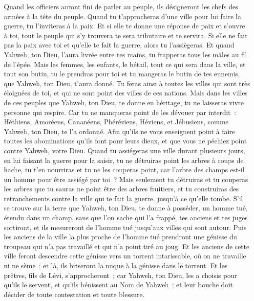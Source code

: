 \begin{multicols}{2}
Quand les officiers auront fini de parler au peuple, ils désigneront les chefs des armées à la tête du peuple.
Quand tu t'approcheras d'une ville pour lui faire la guerre, tu l'inviteras à la paix.
Et si elle te donne une réponse de paix et s'ouvre à toi, tout le peuple qui s'y trouvera te sera tributaire et te servira.
Si elle ne fait pas la paix avec toi et qu'elle te fait la guerre, alors tu l'assiègeras.
Et quand Yahweh, ton Dieu, l'aura livrée entre tes mains, tu frapperas tous les mâles au fil de l'épée.
Mais les femmes, les enfants, le bétail, tout ce qui sera dans la ville, et tout son butin, tu le prendras pour toi et tu mangeras le butin de tes ennemis, que Yahweh, ton Dieu, t'aura donné.
Tu feras ainsi à toutes les villes qui sont très éloignées de toi, et qui ne sont point des villes de ces nations.
Mais dans les villes de ces peuples que Yahweh, ton Dieu, te donne en héritage, tu ne laisseras vivre personne qui respire.
Car tu ne manqueras point de les dévouer par interdit~: Héthiens, Amoréens, Cananéens, Phéréziens, Héviens, et Jébusiens, comme Yahweh, ton Dieu, te l'a ordonné.
Afin qu'ils ne vous enseignent point à faire toutes les abominations qu'ils font pour leurs dieux, et que vous ne péchiez point contre Yahweh, votre Dieu.
Quand tu assiégeras une ville durant plusieurs jours, en lui faisant la guerre pour la saisir, tu ne détruiras point les arbres à coups de hache, tu t'en nourriras et tu ne les couperas point, car l'arbre des champs est-il un homme pour être assiégé par toi~?
Mais seulement tu détruiras et tu couperas les arbres que tu sauras ne point être des arbres fruitiers, et tu construiras des retranchements contre la ville qui te fait la guerre, jusqu'à ce qu'elle tombe.
\VerseOne{}S'il se trouve sur la terre que Yahweh, ton Dieu, te donne à posséder, un homme tué, étendu dans un champ, sans que l'on sache qui l'a frappé,
tes anciens et tes juges sortiront, et ils mesureront de l'homme tué jusqu'aux villes qui sont autour.
Puis les anciens de la ville la plus proche de l'homme tué prendront une génisse du troupeau qui n'a pas travaillé et qui n'a point tiré au joug.
Et les anciens de cette ville feront descendre cette génisse vers un torrent intarissable, où on ne travaille ni ne sème~; et là, ils briseront la nuque à la génisse dans le torrent.
Et les prêtres, fils de Lévi, s'approcheront~; car Yahweh, ton Dieu, les a choisis pour qu'ils le servent, et qu'ils bénissent au Nom de Yahweh~; et leur bouche doit décider de toute contestation et toute blessure.

\end{multicols}
